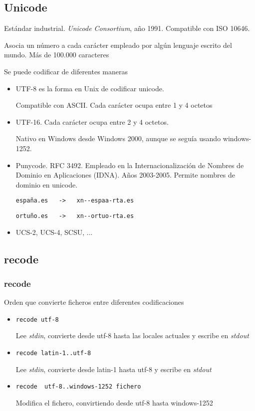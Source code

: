 \documentclass[ucs]{beamer}
\begin{document}
\begin{frame}[fragile]
\subsection{Unicode}
Estándar industrial. \emph{Unicode Consortium}, año 1991. 
Compatible con ISO 10646.

Asocia un número a cada carácter empleado por algún lenguaje escrito del mundo.
Más de 100.000 caracteres

Se puede codificar de diferentes maneras
\begin{itemize}	
\item 
UTF-8 es la forma en Unix de codificar unicode. 

Compatible
con ASCII. Cada carácter ocupa entre 1 y 4 octetos
\item 
UTF-16. Cada carácter ocupa entre 2 y 4 octetos.

Nativo en Windows desde Windows 2000, aunque
se seguía usando windows-1252.
\item 
Punycode. RFC 3492. Empleado en la Internacionalización 
de Nombres de Dominio en Aplicaciones (IDNA). Años 2003-2005. Permite nombres de dominio en unicode.

\verb|españa.es   ->   xn--espaa-rta.es|

\verb|ortuño.es   ->   xn--ortuo-rta.es|

\item 
UCS-2, UCS-4, SCSU, ...
\end{itemize}

\end{frame}
\subsection{recode}
\begin{frame}[fragile]

\frametitle{recode}
Orden que convierte ficheros entre diferentes codificaciones
\begin{itemize}	
\item
\verb|recode utf-8|

Lee \emph{stdin}, convierte desde utf-8 hasta las locales actuales
y escribe en \emph{stdout}
\item
\verb|recode latin-1..utf-8|

Lee \emph{stdin}, convierte desde latin-1 hasta utf-8 
y escribe en \emph{stdout}
\item
\verb|recode  utf-8..windows-1252 fichero|

Modifica el fichero, convirtiendo desde utf-8 hasta 
windows-1252

\end{itemize}
\end{frame}
\end{document}
